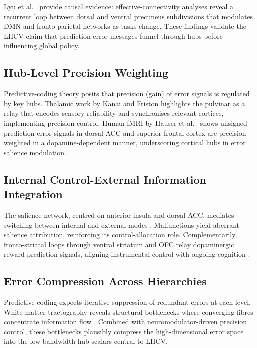 \documentclass[11pt]{article}
\begin{document}
Lyu et al.\ \citep{lyu2021} provide causal evidence: effective-connectivity analyses reveal a recurrent loop between dorsal and ventral precuneus subdivisions that modulates DMN and fronto-parietal networks as tasks change. These findings validate the LHCV claim that prediction-error messages funnel through hubs before influencing global policy.

\subsection{Hub-Level Precision Weighting}

Predictive-coding theory posits that precision (gain) of error signals is regulated by key hubs. Thalamic work by Kanai and Friston \citep{kanai2015} highlights the pulvinar as a relay that encodes sensory reliability and synchronises relevant cortices, implementing precision control. Human fMRI by Hauser et al.\ \citep{hauser2018} shows unsigned prediction-error signals in dorsal ACC and superior frontal cortex are precision-weighted in a dopamine-dependent manner, underscoring cortical hubs in error salience modulation.

\subsection{Internal Control-External Information Integration}

The salience network, centred on anterior insula and dorsal ACC, mediates switching between internal and external modes \citep{menon2023}. Malfunctions yield aberrant salience attribution, reinforcing its control-allocation role. Complementarily, fronto-striatal loops through ventral striatum and OFC relay dopaminergic reward-prediction signals, aligning instrumental control with ongoing cognition \citep{li2021}.

\subsection{Error Compression Across Hierarchies}

Predictive coding expects iterative suppression of redundant errors at each level. White-matter tractography reveals structural bottlenecks where converging fibres concentrate information flow \citep{weiller2025}. Combined with neuromodulator-driven precision control, these bottlenecks plausibly compress the high-dimensional error space into the low-bandwidth hub scalars central to LHCV.



\end{document}
